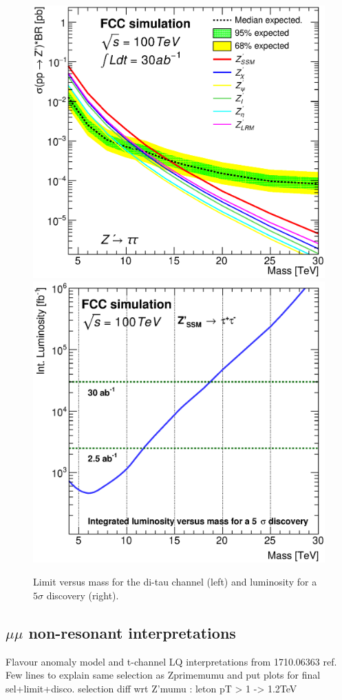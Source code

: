 \documentclass{cernrep}
\begin{document}
\begin{figure}[!htb]
  \centering
  \includegraphics[width=0.45\columnwidth]{Fig/lim_Zprime_tautau_fcc_v02_allxs.eps}
    \includegraphics[width=0.45\columnwidth]{Fig/DiscoveryPotential_tautau_rootStyle.eps}
  \caption{Limit versus mass for the di-tau channel (left) and luminosity for a $5\sigma$ discovery (right). }
  \label{figure:leptonicresonances:resultstautau}
\end{figure}


\subsection{\texorpdfstring{$\mu\mu$}{uu} non-resonant interpretations}
Flavour anomaly model and t-channel LQ interpretations from 1710.06363 ref. Few lines to explain same selection as Zprimemumu and put plots for final sel+limit+disco.
selection diff wrt Z'mumu : leton pT > 1 -> 1.2TeV
\end{document}
